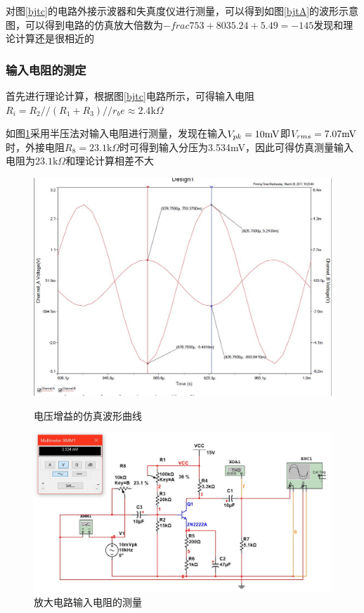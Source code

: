 \documentclass[UTF8,a4paper]{ctexart}
\begin{document}
对图\ref{bjtc}的电路外接示波器和失真度仪进行测量，可以得到如图\ref{bjtA}的波形示意图，可以得到电路的仿真放大倍数为$-frac{753+803}{5.24+5.49}=-145$发现和理论计算还是很相近的
\subsubsection{输入电阻的测定}
首先进行理论计算，根据图\ref{bjtc}电路所示，可得输入电阻$R_i=R_2//(R_1+R_3)//r_be\approx2.4\mathrm{k}\Omega$

如图\ref{bjtri}采用半压法对输入电阻进行测量，发现在输入$V_{pk}=10\rm{mV}$即$V_{rms}=7.07\rm{mV}$时，外接电阻$R_8=23.1\mathrm{k}\Omega$时可得到输入分压为3.534mV，因此可得仿真测量输入电阻为$23.1\mathrm{k}\Omega$和理论计算相差不大
\begin{figure}
\centering
\includegraphics[width=\textwidth]{1-2AA.jpg}
\caption{电压增益的仿真波形曲线}
\label{bjtA}
\includegraphics[width=\textwidth]{1-2Ri.jpg}
\caption{放大电路输入电阻的测量}
\label{bjtri}
\end{figure}
\end{document}
